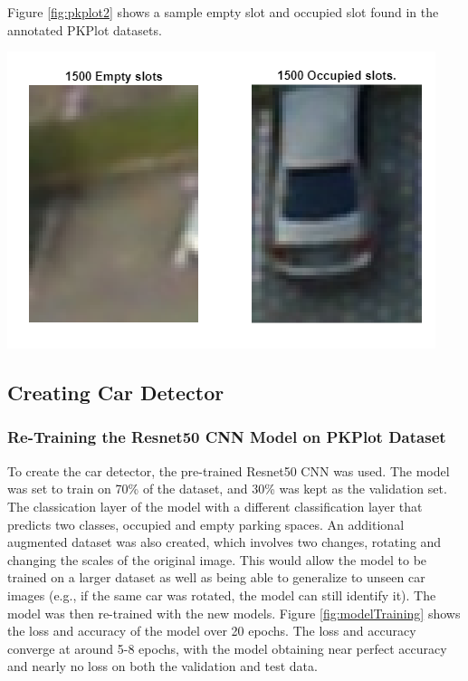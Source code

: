 \documentclass[man]{apa7}
\begin{document}
Figure \ref{fig:pkplot2} shows a sample empty slot and occupied slot found in the annotated PKPlot datasets.

\begin{minipage}{\linewidth}
  \includegraphics[height=\textheight/4,width=\textwidth/2]{figures/pkplot2.png}
  \label{fig:pkplot2}
\end{minipage}


\subsection{Creating Car Detector}

\subsubsection{Re-Training the Resnet50 CNN Model on PKPlot Dataset}
To create the car detector, the pre-trained Resnet50 CNN was used. The model was set to train on 70\% of the dataset, and 30\% was kept as the validation set. The classication layer of the model with a different classification layer that predicts two classes, occupied and empty parking spaces. An additional augmented dataset was also created, which involves two changes, rotating and changing the scales of the original image. This would allow the model to be trained on a larger dataset as well as being able to generalize to unseen car images (e.g., if the same car was rotated, the model can still identify it). The model was then re-trained with the new models. Figure \ref{fig:modelTraining} shows the loss and accuracy of the model over 20 epochs. The loss and accuracy converge at around 5-8 epochs, with the model obtaining near perfect accuracy and nearly no loss on both the validation and test data.
\end{document}
